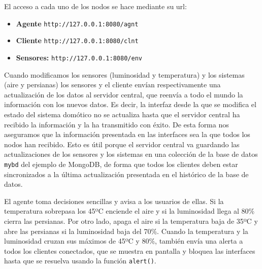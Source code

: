 El acceso a cada uno de los nodos se hace mediante su url:

\begin{itemize}
	\item\textbf{Agente}
		\texttt{http://127.0.0.1:8080/agnt}
	\item\textbf{Cliente}
		\texttt{http://127.0.0.1:8080/clnt}
	\item\textbf{Sensores:}
		\texttt{http://127.0.0.1:8080/env}
\end{itemize}

Cuando modificamos los sensores (luminosidad y temperatura) y los sistemas (aire y persianas) los sensores y el cliente envían respectivamente una actualización de los datos al servidor central, que reenvía a todo el mundo la información con los nuevos datos.
Es decir, la interfaz desde la que se modifica el estado del sistema domótico no se actualiza hasta que el servidor central ha recibido la información y la ha transmitido con éxito.
De esta forma nos aseguramos que la información presentada en las interfaces sea la que todos los nodos han recibido.
Esto es útil porque el servidor central va guardando las actualizaciones de los sensores y los sistemas en una colección de la base de datos \texttt{mybd} del ejemplo de MongoDB, de forma que todos los clientes deben estar sincronizados a la última actualización presentada en el histórico de la base de datos.

El agente toma decisiones sencillas y avisa a los usuarios de ellas.
Si la temperatura sobrepasa los 45ºC enciende el aire y si la luminosidad llega al 80{\%} cierra las persianas.
Por otro lado, apaga el aire si la temperatura baja de 35ºC y abre las persianas si la luminosidad baja del 70{\%}.
Cuando la temperatura y la luminosidad cruzan sus máximos de 45ºC y 80{\%}, también envía una alerta a todos los clientes conectados, que se muestra en pantalla y bloquea las interfaces hasta que se resuelva usando la función \texttt{alert()}.
